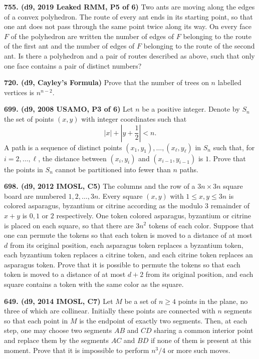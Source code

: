 \documentclass{article}
\begin{document}
\textbf{755. (\color{red}d9\color{black}, 2019 Leaked RMM, P5 of 6)} Two ants are moving along the edges of a convex polyhedron. The route of every ant ends in its starting point, so that one ant does not pass through the same point twice along its way. On every face $F$ of the polyhedron are written the number of edges of $F$ belonging to the route of the first ant and the number of edges of $F$ belonging to the route of the second ant. Is there a polyhedron and a pair of routes described as above, such that only one face contains a pair of distinct numbers?

\textbf{720. (\color{red}d9\color{black}, Cayley's Formula)} Prove that the number of trees on $n$ labelled vertices is $n^{n-2}.$

\textbf{699. (\color{red}d9\color{black}, 2008 USAMO, P3 of 6)} Let $n$ be a positive integer. Denote by $S_n$ the set of points $(x, y)$ with integer coordinates such that\[ \left\lvert x\right\rvert + \left\lvert y + \frac{1}{2} \right\rvert < n. \] A path is a sequence of distinct points $(x_1 , y_1), \ldots, (x_\ell, y_\ell)$ in $S_n$ such that, for $i = 2, \ldots, \ell$, the distance between $(x_i , y_i)$ and $(x_{i-1} , y_{i-1} )$ is $1.$ Prove that the points in $S_n$ cannot be partitioned into fewer than $n$ paths.

\textbf{698. (\color{red}d9\color{black}, 2012 IMOSL, C5)} The columns and the row of a $3n \times 3n$ square board are numbered $1,2,\ldots ,3n$. Every square $(x,y)$ with $1 \leq x,y \leq 3n$ is colored asparagus, byzantium or citrine according as the modulo $3$ remainder of $x+y$ is $0,1$ or $2$ respectively. One token colored asparagus, byzantium or citrine is placed on each square, so that there are $3n^2$ tokens of each color.
Suppose that one can permute the tokens so that each token is moved to a distance of at most $d$ from its original position, each asparagus token replaces a byzantium token, each byzantium token replaces a citrine token, and each citrine token replaces an asparagus token. Prove that it is possible to permute the tokens so that each token is moved to a distance of at most $d+2$ from its original position, and each square contains a token with the same color as the square.

\textbf{649. (\color{red}d9\color{black}, 2014 IMOSL, C7)} Let $M$ be a set of $n \ge 4$ points in the plane, no three of which are collinear. Initially these points are connected with $n$ segments so that each point in $M$ is the endpoint of exactly two segments. Then, at each step, one may choose two segments $AB$ and $CD$ sharing a common interior point and replace them by the segments $AC$ and $BD$ if none of them is present at this moment. Prove that it is impossible to perform $n^3 /4$ or more such moves.
\end{document}
